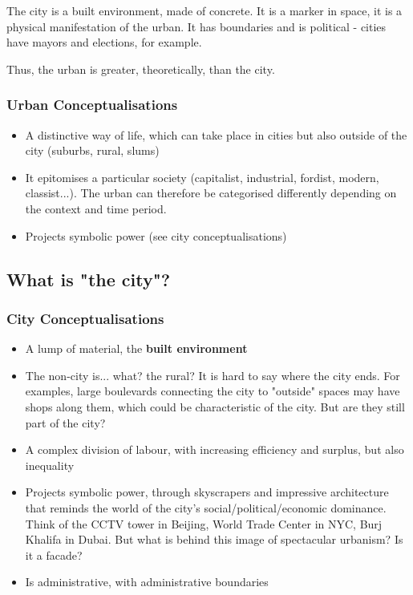 \documentclass{article}
\begin{document}
The city is a built environment, made of concrete. It is a marker in space, it is a physical manifestation of the urban. 
It has boundaries and is political - cities have mayors and elections, for example.

Thus, the urban is greater, theoretically, than the city.

\subsubsection{Urban Conceptualisations}

\begin{itemize}
  \item A distinctive way of life, which can take place in cities but also outside of the city (suburbs, rural, slums)
  \item It epitomises a particular society (capitalist, industrial, fordist, modern, classist...). The urban can therefore be categorised differently depending on the context and time period. 
  \item Projects symbolic power (see city conceptualisations)
\end{itemize}

\subsection{What is "the city"?}

\subsubsection{City Conceptualisations}

\begin{itemize}
  \item A lump of material, the \textbf{built environment}
  \item The non-city is... what? the rural? It is hard to say where the city ends. For examples, large boulevards connecting the city to "outside" spaces may have shops along them, which could be characteristic of the city. But are they still part of the city?
  \item A complex division of labour, with increasing efficiency and surplus, but also inequality
  \item Projects symbolic power, through skyscrapers and impressive architecture that reminds the world of the city's social/political/economic dominance. Think of the CCTV tower in Beijing, World Trade Center in NYC, Burj Khalifa in Dubai. But what is behind this image of spectacular urbanism? Is it a facade?
  \item Is administrative, with administrative boundaries
\end{itemize}
\end{document}

